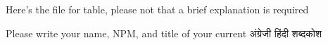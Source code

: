 Here's the file for table, please not that a brief explanation is required

Please write your name, NPM, and title of your current अंग्रेजी हिंदी शब्दकोश